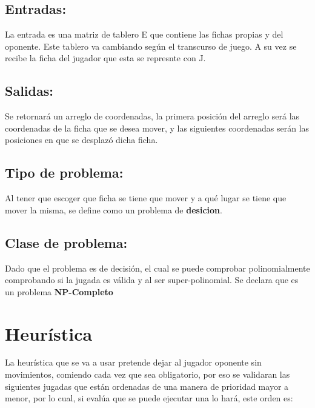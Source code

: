 \documentclass[12pt]{article}
\begin{document}
        
    \subsection{Entradas:}
        La entrada es una matriz de tablero E que contiene las fichas propias y del oponente. Este tablero va cambiando según el transcurso de juego. A su vez se recibe la ficha del jugador que esta se represnte con J.
                
    \subsection{Salidas:}
        Se retornará un arreglo de coordenadas, la primera posición del arreglo será las coordenadas de la ficha que se desea mover, y las siguientes coordenadas serán las posiciones en que se desplazó dicha ficha.
                
    \subsection{Tipo de problema:}
        Al tener que escoger que ficha se tiene que mover y a qué lugar se tiene que mover la misma, se define como un problema de \textbf{desicion}.
            
    \subsection{Clase de problema:}
        Dado que el problema es de decisión, el cual se puede comprobar polinomialmente comprobando si la jugada es válida y al ser super-polinomial. Se declara que es un problema \textbf{NP-Completo}

\section{Heurística}

    La heurística que se va a usar pretende dejar al jugador oponente sin movimientos, comiendo cada vez que sea obligatorio, por eso se validaran las siguientes jugadas que están ordenadas de una manera de prioridad mayor a menor, por lo cual, si evalúa que se puede ejecutar una lo hará, este orden es:
    
\end{document}
